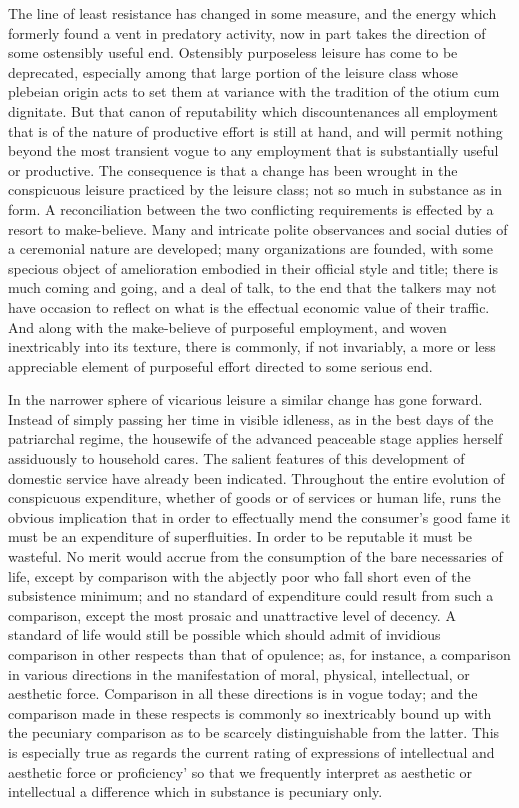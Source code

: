 \documentclass[12pt]{report}
\begin{document}
The line of least resistance has changed in some measure, and the energy
which formerly found a vent in predatory activity, now in part takes the
direction of some ostensibly useful end. Ostensibly purposeless leisure
has come to be deprecated, especially among that large portion of the
leisure class whose plebeian origin acts to set them at variance with
the tradition of the otium cum dignitate. But that canon of reputability
which discountenances all employment that is of the nature of productive
effort is still at hand, and will permit nothing beyond the most
transient vogue to any employment that is substantially useful or
productive. The consequence is that a change has been wrought in the
conspicuous leisure practiced by the leisure class; not so much in
substance as in form. A reconciliation between the two conflicting
requirements is effected by a resort to make-believe. Many and intricate
polite observances and social duties of a ceremonial nature are
developed; many organizations are founded, with some specious object of
amelioration embodied in their official style and title; there is much
coming and going, and a deal of talk, to the end that the talkers may
not have occasion to reflect on what is the effectual economic value of
their traffic. And along with the make-believe of purposeful employment,
and woven inextricably into its texture, there is commonly, if not
invariably, a more or less appreciable element of purposeful effort
directed to some serious end.

In the narrower sphere of vicarious leisure a similar change has gone
forward. Instead of simply passing her time in visible idleness, as in
the best days of the patriarchal regime, the housewife of the advanced
peaceable stage applies herself assiduously to household cares. The
salient features of this development of domestic service have already
been indicated. Throughout the entire evolution of conspicuous
expenditure, whether of goods or of services or human life, runs the
obvious implication that in order to effectually mend the consumer's
good fame it must be an expenditure of superfluities. In order to
be reputable it must be wasteful. No merit would accrue from the
consumption of the bare necessaries of life, except by comparison with
the abjectly poor who fall short even of the subsistence minimum; and no
standard of expenditure could result from such a comparison, except the
most prosaic and unattractive level of decency. A standard of life would
still be possible which should admit of invidious comparison in other
respects than that of opulence; as, for instance, a comparison
in various directions in the manifestation of moral, physical,
intellectual, or aesthetic force. Comparison in all these directions is
in vogue today; and the comparison made in these respects is commonly
so inextricably bound up with the pecuniary comparison as to be scarcely
distinguishable from the latter. This is especially true as regards the
current rating of expressions of intellectual and aesthetic force
or proficiency' so that we frequently interpret as aesthetic or
intellectual a difference which in substance is pecuniary only.
\end{document}
